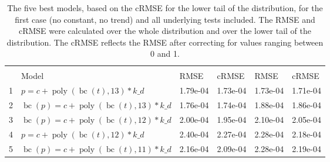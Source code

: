 \documentclass[12pt,a4paper]{article}
\DeclareMathOperator{\bc}{bc}
\DeclareMathOperator{\poly}{poly}
\begin{document}
\begin{table}[!h]

\caption{\label{tab:5_best_all_1}\label{tab:best_all_1} The five best models, based on the cRMSE for the lower tail of the distribution, for the first case (no constant, no trend) and all underlying tests included. The RMSE and cRMSE were calculated over the whole distribution and over the lower tail of the distribution. The cRMSE reflects the RMSE after correcting for values ranging between 0 and 1.}
\centering
\fontsize{10}{12}\selectfont
\begin{tabular}[t]{ll>{\raggedleft\arraybackslash}p{2cm}>{\raggedleft\arraybackslash}p{2cm}>{\raggedleft\arraybackslash}p{2cm}>{\raggedleft\arraybackslash}p{2cm}}
\toprule
\multicolumn{1}{c}{\textbf{}} & \multicolumn{1}{c}{\textbf{}} & \multicolumn{2}{c}{\textbf{Full Distribution}} & \multicolumn{2}{c}{\textbf{Lower Tail ($p \leq 0.2$)}} \\
\cmidrule(l{3pt}r{3pt}){3-4} \cmidrule(l{3pt}r{3pt}){5-6}
  & Model & RMSE & cRMSE & RMSE & cRMSE\\
\midrule
\rowcolor{gray!6}  1 & $p = c + \poly\left( \bc(t), 13 \right) * k\_d$ & 1.79e-04 & 1.73e-04 & 1.73e-04 & 1.71e-04\\
2 & $\bc(p) = c + \poly\left( \bc(t), 13 \right) * k\_d$ & 1.76e-04 & 1.74e-04 & 1.88e-04 & 1.86e-04\\
\rowcolor{gray!6}  3 & $\bc(p) = c + \poly\left( \bc(t), 12 \right) * k\_d$ & 2.00e-04 & 1.95e-04 & 2.10e-04 & 2.05e-04\\
4 & $p = c + \poly\left( \bc(t), 12 \right) * k\_d$ & 2.40e-04 & 2.27e-04 & 2.28e-04 & 2.18e-04\\
\rowcolor{gray!6}  5 & $\bc(p) = c + \poly\left( \bc(t), 11 \right) * k\_d$ & 2.16e-04 & 2.09e-04 & 2.28e-04 & 2.19e-04\\
\bottomrule
\end{tabular}
\end{table}
\end{document}
